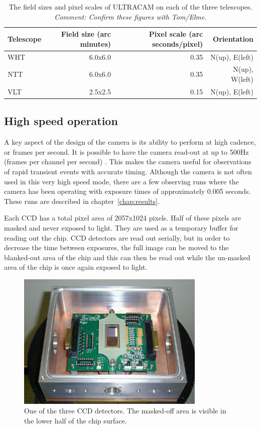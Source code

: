 \begin{center}
\begin{table}
	\begin{tabular}{|l|r|r|r|}
    	\hline
		Telescope & Field size (arc minutes) & Pixel scale (arc seconds/pixel) & Orientation \\
		\hline
		WHT & 6.0x6.0 &  0.35 & N(up), E(left)\\
		NTT & 6.0x6.0 & 0.35 & N(up), W(left)\\
		VLT & 2.5x2.5 & 0.15 & N(up), E(left) \\
		\hline
	\end{tabular}
	\caption{The field sizes and pixel scales of ULTRACAM on each of the three telescopes. \emph{Comment: Confirm these figures with Tom/Elme.}}
	\label{tab:pixelscale}
\end{table}
\end{center}



\subsection{High speed operation}
A key aspect of the design of the camera is its ability to perform at high cadence, or frames per second. It is possible to have the camera read-out at up to 500Hz (frames per channel per second) \cite{dhillon07}. This makes the camera useful for observations of rapid transient events with accurate timing. Although the camera is not often used in this very high speed mode, there are a few observing runs where the camera has been operating with exposure times of approximately 0.005 seconds. These runs are described in chapter~\ref{chap:results}.

Each CCD has a total pixel area of 2057x1024 pixels. Half of these pixels are masked and never exposed to light. They are used as a temporary buffer for reading out the chip. CCD detectors are read out serially, but in order to decrease the time between exposures, the full image can be moved to the blanked-out area of the chip and this can then be read out while the un-masked area of the chip is once again exposed to light. 

\begin{figure}[!h]
\centering
\includegraphics[width=90mm]{images/ccd.png}
\caption{One of the three CCD detectors. The masked-off area is visible in the lower half of the chip surface.}
\label{fig2}
\end{figure}


